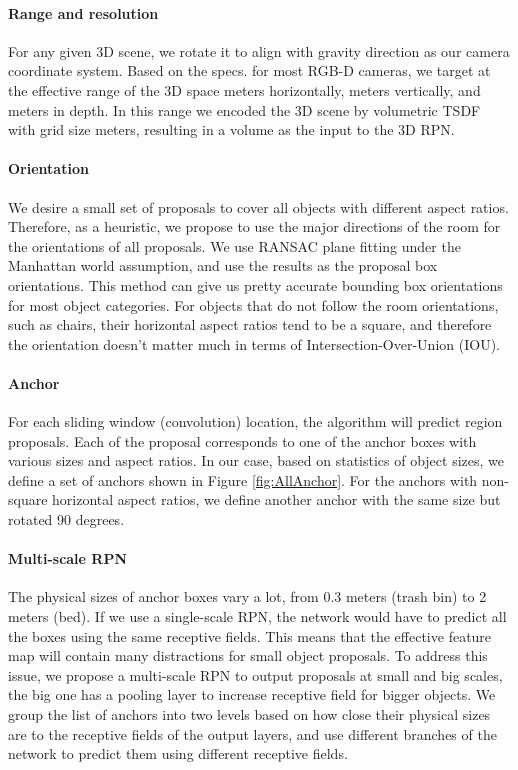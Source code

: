 \documentclass[10pt,twocolumn,letterpaper]{article}
\begin{document}
\vspace{-4mm}\paragraph{Range and resolution}
For any given 3D scene, we rotate it to align with gravity direction as our camera coordinate system.
Based on the specs. for most RGB-D cameras,
we target at the effective range of the 3D space  meters horizontally,   meters vertically, and  meters in depth. 
In this range we encoded the 3D scene by volumetric TSDF with grid size  meters,
resulting in a  volume as the input to the 3D RPN.



\vspace{-4mm}\paragraph{Orientation}
We desire a small set of proposals to cover all objects with different aspect ratios.
Therefore, as a heuristic, we propose to use the major directions of the room for the orientations of all proposals.
We use RANSAC plane fitting under the Manhattan world assumption, and use the results as the proposal box orientations. 
This method can give us pretty accurate bounding box orientations for most object categories. 
For objects that do not follow the room orientations, such as chairs, 
their horizontal aspect ratios tend to be a square, and therefore the orientation doesn't matter much in terms of Intersection-Over-Union (IOU).

\vspace{-4mm}\paragraph{Anchor}
For each sliding window (\ie convolution) location, the algorithm will predict  region proposals. 
Each of the proposal corresponds to one of the  anchor boxes with various sizes and aspect ratios.
In our case, based on statistics of object sizes, we define a set of  anchors shown in Figure \ref{fig:AllAnchor}.
For the anchors with non-square horizontal aspect ratios, we define another anchor with the same size but rotated 90 degrees.

\vspace{-4mm}\paragraph{Multi-scale RPN}
The physical sizes of anchor boxes vary a lot, from 0.3 meters (\eg trash bin) to 2 meters (\eg bed). 
If we use a single-scale RPN, the network would have to predict all the boxes using the same receptive fields.
This means that the effective feature map will contain many distractions for small object proposals. 
To address this issue,
we propose a multi-scale RPN to output proposals at small and big scales, the big one has a pooling layer to increase receptive field for bigger objects.
We group the list of anchors into two levels based on how close their physical sizes are to the receptive fields of the output layers,
and use different branches of the network to predict them using different receptive fields.
\end{document}
